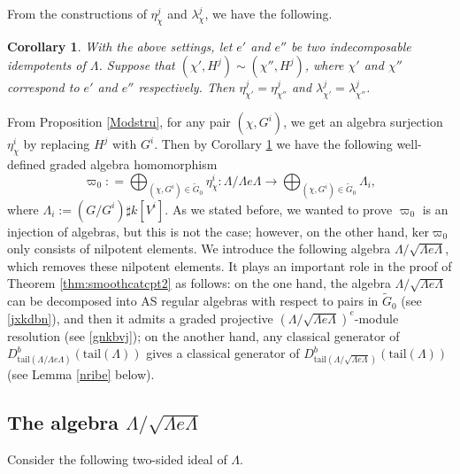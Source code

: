 \documentclass[11pt,reqno]{amsart}
\newtheorem{corollary}[theorem]{Corollary}
\theoremstyle{definition}
\begin{document}
From the constructions of $\eta^{j}_{\chi}$ and $\lambda^{j}_{\chi}$, we have the following.
 
\begin{corollary}\label{DiffIde2}
With the above settings, let $e'$ and $e''$ be two indecomposable idempotents of $\Lambda$. Suppose that 
$(\chi', H^j) \sim (\chi'', H^j)$, where $\chi'$ and $\chi''$ correspond to $e'$ and $e''$ respectively.
Then 
$\eta^{j}_{\chi'} = \eta^{j}_{\chi''}$ and $\lambda^{j}_{\chi'} = \lambda^{j}_{\chi''}$.
\end{corollary}


From Proposition \ref{Modstru}, 
for any pair $(\chi, G^i)$, we get
an algebra surjection 
$\eta^{i}_{\chi}$ by replacing $H^j$ with 
$G^i$. Then by Corollary
\ref{DiffIde2}
we have the following well-defined 
graded algebra homomorphism 
$$
\varpi_0 : =  \bigoplus_{(\chi, G^i) \in \tilde{G}_0} \eta^{i}_{\chi}: 
\Lambda / \Lambda e \Lambda \rightarrow \bigoplus_{(\chi, G^i) \in \tilde{G}_0} \Lambda_i,
$$ 
where $\Lambda_i := (G/G^i) \sharp k[V^i]$. 
As we stated before, we 
wanted to prove $\varpi_0$
is an injection of algebras, but
this is not the case; however, on
the other hand, $\mathrm{ker}\varpi_0$
only consists of nilpotent elements.
We introduce the following
algebra $\Lambda/\sqrt{\Lambda e\Lambda}$, which
removes these nilpotent elements.
It plays an important
role in the proof of Theorem \ref{thm:smoothcatcpt2} as follows:
on the one hand, the algebra $\Lambda / \sqrt{\Lambda e\Lambda}$ can be decomposed 
into AS regular algebras with respect to pairs in $\tilde{G}_0$ (see \eqref{jxkdbn}), 
and then it admits a graded projective $(\Lambda / \sqrt{\Lambda e\Lambda})^e$-module 
resolution (see \ref{gnkbvj}); on the another hand, any classical generator of  
$D^{b}_{\mathrm{tail}(\Lambda/ \Lambda e \Lambda)}(\mathrm{tail}(\Lambda))$ 
gives a classical generator of  
$D^{b}_{\mathrm{tail}(\Lambda/ 
\sqrt{ \Lambda e \Lambda})}(\mathrm{tail}(\Lambda))$ (see Lemma \ref{nribe} below). 



\subsection{The algebra $\Lambda/ \sqrt{\Lambda e\Lambda}$}

Consider the following two-sided ideal of $\Lambda$. 
\end{document}
